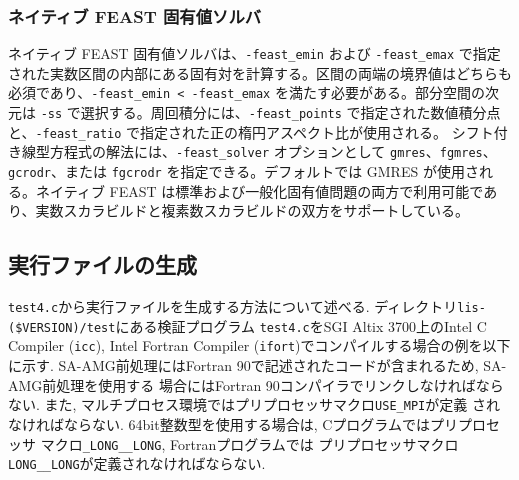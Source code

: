 \documentclass[a4paper]{jarticle}
\begin{document}
{{\subsubsection{ネイティブ FEAST 固有値ソルバ}
ネイティブ FEAST 固有値ソルバは、\verb|-feast_emin| および \verb|-feast_emax| で指定された実数区間の内部にある固有対を計算する。区間の両端の境界値はどちらも必須であり、\verb|-feast_emin < -feast_emax| を満たす必要がある。部分空間の次元は \verb|-ss| で選択する。周回積分には、\verb|-feast_points| で指定された数値積分点と、\verb|-feast_ratio| で指定された正の楕円アスペクト比が使用される。
シフト付き線型方程式の解法には、\verb|-feast_solver| オプションとして \verb|gmres|、\verb|fgmres|、\verb|gcrodr|、または \verb|fgcrodr| を指定できる。デフォルトでは GMRES が使用される。ネイティブ FEAST は標準および一般化固有値問題の両方で利用可能であり、実数スカラビルドと複素数スカラビルドの双方をサポートしている。

\newpage
\subsection{実行ファイルの生成}
\verb|test4.c|から実行ファイルを生成する方法について述べる. 
ディレクトリ\verb|lis-($VERSION)/test|にある検証プログラム
\verb|test4.c|をSGI Altix 3700上のIntel C Compiler (\verb|icc|), 
Intel Fortran Compiler (\verb|ifort|)でコンパイルする場合の例を以下に示す.  
SA-AMG前処理にはFortran 90で記述されたコードが含まれるため, SA-AMG前処理を使用する
場合にはFortran 90コンパイラでリンクしなければならない. 
また, マルチプロセス環境ではプリプロセッサマクロ\verb|USE_MPI|が定義
されなければならない. 
64bit整数型を使用する場合は, Cプログラムではプリプロセッサ
マクロ{\tt \_LONG\_\_LONG}, Fortranプログラムでは
プリプロセッサマクロ{\tt LONG\_\_LONG}が定義されなければならない. 

}}
\end{document}

